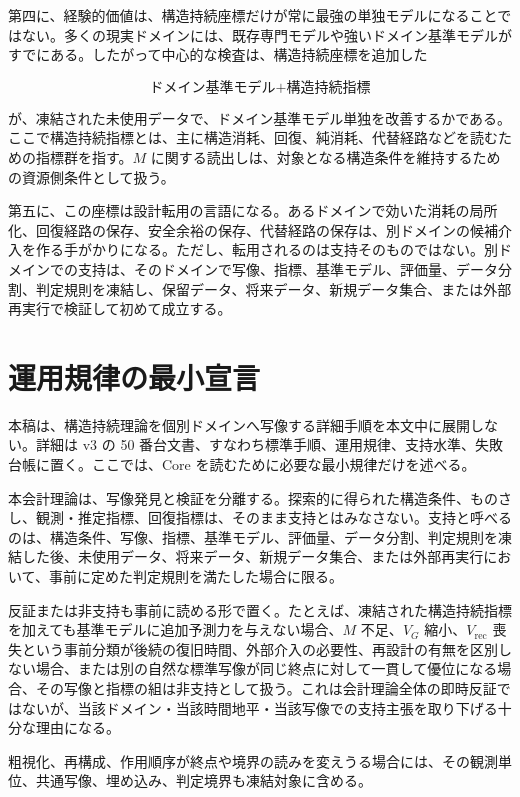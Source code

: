 \documentclass[12pt,a4paper]{article}
\begin{document}
第四に、経験的価値は、構造持続座標だけが常に最強の単独モデルになることではない。多くの現実ドメインには、既存専門モデルや強いドメイン基準モデルがすでにある。したがって中心的な検査は、構造持続座標を追加した

\[
\text{ドメイン基準モデル}+\text{構造持続指標}
\]

が、凍結された未使用データで、ドメイン基準モデル単独を改善するかである。ここで構造持続指標とは、主に構造消耗、回復、純消耗、代替経路などを読むための指標群を指す。\(M\) に関する読出しは、対象となる構造条件を維持するための資源側条件として扱う。

第五に、この座標は設計転用の言語になる。あるドメインで効いた消耗の局所化、回復経路の保存、安全余裕の保存、代替経路の保存は、別ドメインの候補介入を作る手がかりになる。ただし、転用されるのは支持そのものではない。別ドメインでの支持は、そのドメインで写像、指標、基準モデル、評価量、データ分割、判定規則を凍結し、保留データ、将来データ、新規データ集合、または外部再実行で検証して初めて成立する。

\section{運用規律の最小宣言}\label{ux904bux7528ux898fux5f8bux306eux6700ux5c0fux5ba3ux8a00}

本稿は、構造持続理論を個別ドメインへ写像する詳細手順を本文中に展開しない。詳細は v3 の 50 番台文書、すなわち標準手順、運用規律、支持水準、失敗台帳に置く。ここでは、Core を読むために必要な最小規律だけを述べる。

本会計理論は、写像発見と検証を分離する。探索的に得られた構造条件、ものさし、観測・推定指標、回復指標は、そのまま支持とはみなさない。支持と呼べるのは、構造条件、写像、指標、基準モデル、評価量、データ分割、判定規則を凍結した後、未使用データ、将来データ、新規データ集合、または外部再実行において、事前に定めた判定規則を満たした場合に限る。

反証または非支持も事前に読める形で置く。たとえば、凍結された構造持続指標を加えても基準モデルに追加予測力を与えない場合、\(M\) 不足、\(V_{G}\) 縮小、\(V_{\mathrm{rec}}\) 喪失という事前分類が後続の復旧時間、外部介入の必要性、再設計の有無を区別しない場合、または別の自然な標準写像が同じ終点に対して一貫して優位になる場合、その写像と指標の組は非支持として扱う。これは会計理論全体の即時反証ではないが、当該ドメイン・当該時間地平・当該写像での支持主張を取り下げる十分な理由になる。

粗視化、再構成、作用順序が終点や境界の読みを変えうる場合には、その観測単位、共通写像、埋め込み、判定境界も凍結対象に含める。
\end{document}
